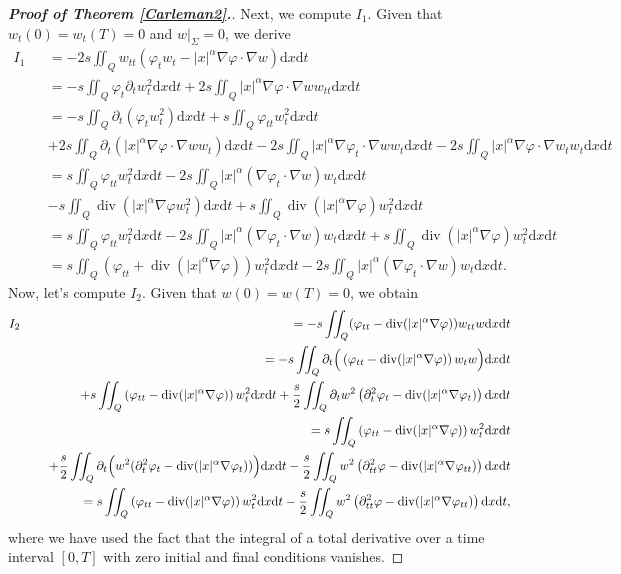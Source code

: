 \documentclass[11pt]{article}
\numberwithin{equation}{section}
\def\pt{\partial}
\def\vp{\varphi}
\def\bf{\textbf}
\def\pt{\partial}
\def\al{\alpha}
\def\f{\frac}
\def\df{\mathrm d}
\DeclareMathOperator{\Div}{div}
\begin{document}
\begin{proof}[{\rm \bf { Proof of  Theorem \ref{Carleman2}.}}]
			
			
			Next, we compute  $I_1$. Given that  $w_t(0)=w_t(T)=0$ and $w|_{\Sigma}=0$, we derive
			\begin{eqnarray*}
				I_1
				&&=-2s\iint_Q w_{tt}(\vp_tw_t-|x|^\al \nabla\vp\cdot \nabla w)\df x\df t \\
				&&=-s\iint_Q \vp_t \pt_t w_t^2\df x\df t+2s\iint_Q |x|^\al \nabla\vp\cdot \nabla w w_{tt}\df x\df t\\
				&&=-s\iint_Q\pt_t\left(\vp_t w_t^2\right)\df x\df t+s\iint_Q \vp_{tt}w_t^2\df x\df t\\
				&& +2s\iint_Q\pt_t\left(|x|^\al \nabla\vp\cdot \nabla w w_t\right)\df x\df t-2s\iint_Q|x|^\al\nabla\vp_t \cdot \nabla w w_t\df x\df t-2s\iint_Q |x|^\al\nabla \vp\cdot \nabla w_t w_t\df x\df t\\
				&&=s\iint_Q \vp_{tt}w_t^2\df x\df t-2s\iint_Q|x|^\al(\nabla\vp_t \cdot \nabla w) w_t\df x\df t\\
				&& -s\iint_Q \Div\left(|x|^\al\nabla \vp    w_t^2\right) \df x\df t+s\iint_Q \Div\left(|x|^\al \nabla \vp\right) w_t^2\df x\df t\\
				&&=s\iint_Q \vp_{tt}w_t^2\df x\df t-2s\iint_Q|x|^\al(\nabla\vp_t \cdot \nabla w) w_t\df x\df t+s\iint_Q \Div\left(|x|^\al \nabla \vp\right) w_t^2\df x\df t\\
				&&=s\iint_Q\left(\vp_{tt}+\Div \left(|x|^\al \nabla\vp\right)\right) w_t^2\df x\df t-2s\iint_Q|x|^\al(\nabla\vp_t \cdot \nabla w) w_t\df x\df t.
			\end{eqnarray*}
			Now, let's compute $I_2$.  Given that $w(0)=w(T)=0$, we obtain
			\begin{eqnarray*}
				I_2
				&&=-s\iint_Q(\vp_{tt}-\Div (|x|^\al \nabla\vp))w_{tt}w\df x\df t\\
				&&=-s\iint_Q\pt_t\Big( \left(\vp_{tt}-\Div (|x|^\al \nabla\vp)\right)w_{t}w\Big)\df x\df t\\
				&& +s\iint_Q\left(\vp_{tt}-\Div (|x|^\al \nabla \vp)\right)w_t^2\df x\df t+\f{s}{2}\iint_Q \pt_t w^2\left(\pt_t^2\vp_t-\Div(|x|^\al \nabla \vp_t)\right)\df x\df t\\
				&&=s\iint_Q\left(\vp_{tt}-\Div (|x|^\al \nabla \vp)\right)w_t^2\df x\df t\\
				&&\hspace{4.5mm}+\f{s}{2}\iint_Q\pt_t\Big(w^2(\pt_t^2\vp_t-\Div(|x|^\al \nabla \vp_t))\Big)\df x\df t-\f{s}{2}\iint_Q w^2\left(\pt_{tt}^2\vp-\Div(|x|^\al \nabla \vp_{tt})\right)\df x\df t\\
				&&=s\iint_Q\left(\vp_{tt}-\Div (|x|^\al \nabla \vp)\right)w_t^2\df x\df t-\f{s}{2}\iint_Q w^2\left(\pt_{tt}^2\vp-\Div(|x|^\al \nabla \vp_{tt})\right)\df x\df t,
			\end{eqnarray*}
			where we have used the fact that the integral of a total derivative over a time interval $[0,T]$ with zero initial and final conditions vanishes.
			

\end{proof}
\end{document}
